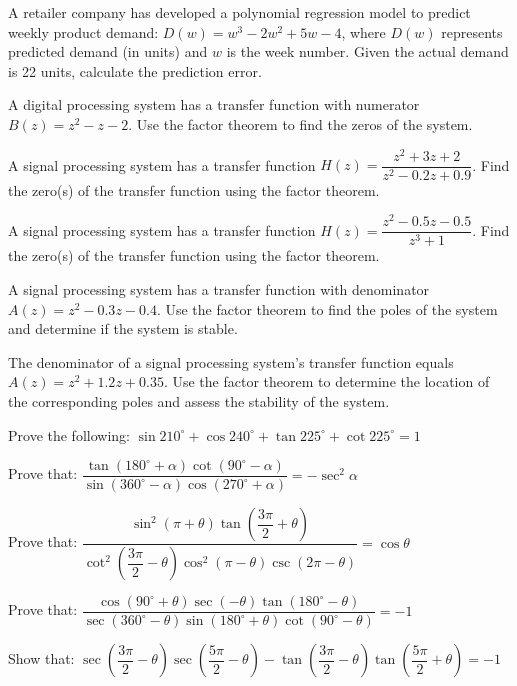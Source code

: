 \documentclass[11pt,a4paper]{article}
\begin{document}
\begin{longlist}
\item A retailer company has developed a polynomial regression model to predict weekly product demand: $D(w)=w^3-2w^2+5w-4$, where $D(w)$ represents predicted demand (in units) and $w$ is the week number. Given the actual demand is 22 units, calculate the prediction error.

\item A digital processing system has a transfer function with numerator $B(z)=z^2-z-2$. Use the factor theorem to find the zeros of the system.

\item A signal processing system has a transfer function $H(z)=\dfrac{z^2+3z+2}{z^2-0.2z+0.9}$. Find the zero(s) of the transfer function using the factor theorem.

\item A signal processing system has a transfer function $H(z)=\dfrac{z^2-0.5z-0.5}{z^3+1}$. Find the zero(s) of the transfer function using the factor theorem.

\item A signal processing system has a transfer function with denominator $A(z)=z^2-0.3z-0.4$. Use the factor theorem to find the poles of the system and determine if the system is stable.

\item The denominator of a signal processing system's transfer function equals $A(z)=z^2+1.2z+0.35$. Use the factor theorem to determine the location of the corresponding poles and assess the stability of the system.

\item Prove the following: $\sin210^\circ+\cos240^\circ+\tan225^\circ+\cot225^\circ=1$

\item Prove that: $\dfrac{\tan(180^\circ+\alpha)\cot(90^\circ-\alpha)}{\sin(360^\circ-\alpha)\cos(270^\circ+\alpha)}=-\sec^2\alpha$

\item Prove that: $\dfrac{\sin^2(\pi+\theta)\tan\left(\dfrac{3\pi}{2}+\theta\right)}{\cot^2\left(\dfrac{3\pi}{2}-\theta\right)\cos^2(\pi-\theta)\csc(2\pi-\theta)}=\cos\theta$

\item Prove that: $\dfrac{\cos(90^\circ+\theta)\sec(-\theta)\tan(180^\circ-\theta)}{\sec(360^\circ-\theta)\sin(180^\circ+\theta)\cot(90^\circ-\theta)}=-1$

\item Show that: $\sec\left(\dfrac{3\pi}{2}-\theta\right)\sec\left(\dfrac{5\pi}{2}-\theta\right)-\tan\left(\dfrac{3\pi}{2}-\theta\right)\tan\left(\dfrac{5\pi}{2}+\theta\right)=-1$


\end{longlist}
\end{document}
